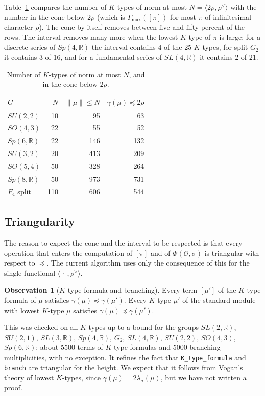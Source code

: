 \documentclass[11pt,leqno]{article}
\theoremstyle{definition}
\newtheorem{observation}[equation]{Observation}
\numberwithin{equation}{section}
\newcommand{\Ob}{\mathcal O}
\newcommand{\R}{\mathbb R}
\newcommand{\ch}[1]{#1^\vee}
\newcommand{\at}[1]{\texttt{#1}}
\begin{document}
Table~\ref{tab:cone} compares the number of $K$-types of norm at most
$N=\langle 2\rho,\ch\rho\rangle$ with the number in the cone below $2\rho$
(which is $\Gamma_{\max}([\pi])$ for most $\pi$ of infinitesimal character
$\rho$).  The cone by itself removes between five and fifty percent of the
rows.  The
interval removes many more when the lowest $K$-type of $\pi$ is large: for a
discrete series of $Sp(4,\R)$ the interval contains 4 of the 25 $K$-types, for
split $G_2$ it contains 3 of 16, and for a fundamental series of $SL(4,\R)$ it
contains 2 of 21.

\begin{table}[ht]
\centering
\begin{tabular}{lrrr}
\toprule
$G$ & $N$ & $\|\mu\|\le N$ & $\gamma(\mu)\preceq 2\rho$\\
\midrule
$SU(2,2)$ & 10 & 95 & 63\\
$SO(4,3)$ & 22 & 55 & 52\\
$Sp(6,\R)$ & 22 & 146 & 132\\
$SU(3,2)$ & 20 & 413 & 209\\
$SO(5,4)$ & 50 & 328 & 264\\
$Sp(8,\R)$ & 50 & 973 & 731\\
$F_4$ split & 110 & 606 & 544\\
\bottomrule
\end{tabular}
\caption{Number of $K$-types of norm at most $N$, and in the cone below
$2\rho$.}
\label{tab:cone}
\end{table}

\subsection{Triangularity}

The reason to expect the cone and the interval to be respected is that every
operation that enters the computation of $[\pi]$ and of $\Phi(\Ob,\sigma)$ is
triangular with respect to $\preceq$.  The current algorithm uses only the
consequence of this for the single functional
$\langle\,\cdot\,,\ch\rho\rangle$.

\begin{observation}[$K$-type formula and branching]
\label{o:branch}
Every term $[\mu']$ of the $K$-type formula of $\mu$ satisfies
$\gamma(\mu)\preceq\gamma(\mu')$.  Every $K$-type $\mu'$ of the standard module
with lowest $K$-type $\mu$ satisfies $\gamma(\mu)\preceq\gamma(\mu')$.
\end{observation}

This was checked on all $K$-types up to a bound for the groups $SL(2,\R)$,
$SU(2,1)$, $SL(3,\R)$, $Sp(4,\R)$, $G_2$, $SL(4,\R)$, $SU(2,2)$, $SO(4,3)$,
$Sp(6,\R)$: about 5500 terms of $K$-type formulas and 5000 branching
multiplicities, with no exception.  It refines the fact that
\at{K\_type\_formula} and \at{branch} are triangular for the height.  We expect
that it follows from Vogan's theory of lowest $K$-types, since
$\gamma(\mu)=2\lambda_a(\mu)$, but we have not written a proof.
\end{document}
